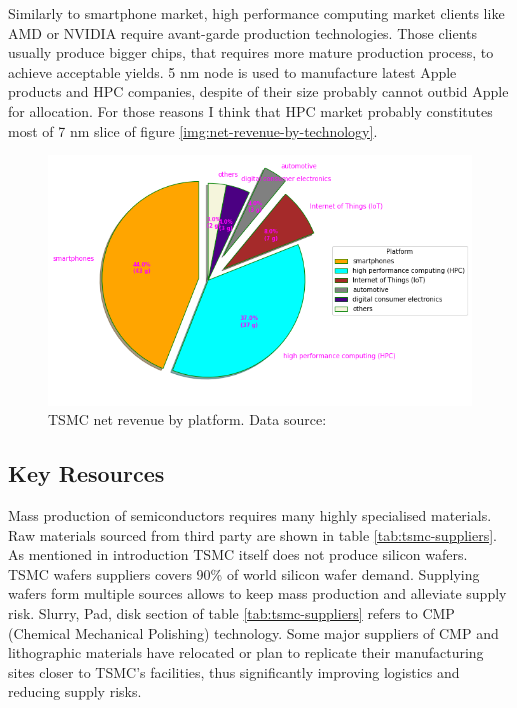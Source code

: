 \documentclass[a4paper,12pt]{article}
\begin{document}
Similarly to smartphone market, high performance computing market clients like AMD or NVIDIA require avant-garde production technologies.
Those clients usually produce bigger chips, that requires more mature production process, to achieve acceptable yields.
5 nm node is used to manufacture latest Apple products and HPC companies, despite of their size probably cannot outbid Apple for allocation.
For those reasons I think that HPC market probably constitutes most of 7 nm slice of figure \ref{img:net-revenue-by-technology}.

\begin{figure}
    \includegraphics[width=0.9\linewidth]{net_revenue_by_platform.png}
    \caption{TSMC net revenue by platform. Data source: \cite{TSMCAnnualReport}}
    \label{img:net-revenue-by-platform}
\end{figure}


\subsection{Key Resources}
Mass production of semiconductors requires many highly specialised materials. 
Raw materials sourced from third party are shown in table \ref{tab:tsmc-suppliers}. 
As mentioned in introduction TSMC itself does not produce silicon wafers. 
TSMC wafers suppliers covers 90\% of world silicon wafer demand. 
Supplying wafers form multiple sources allows to keep mass production and alleviate supply risk.
Slurry, Pad, disk section of table \ref{tab:tsmc-suppliers} refers to CMP (Chemical Mechanical Polishing) technology. 
Some major suppliers of CMP and lithographic materials have relocated or plan to replicate their manufacturing sites closer to TSMC’s  facilities, thus significantly improving logistics and reducing supply risks. 


\end{document}
